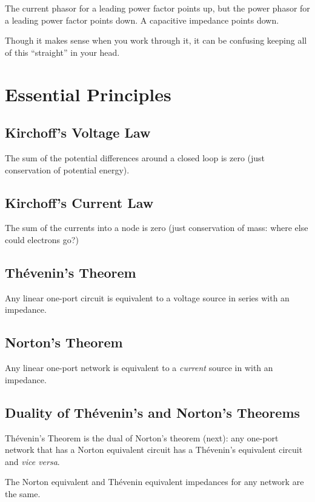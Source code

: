 \documentclass[11pt]{article}
\begin{document}
The current phasor for a leading power factor points up, but the power
phasor for a leading power factor points down. A capacitive impedance
points down.

Though it makes sense when you work through it, it can be confusing
keeping all of this ``straight'' in your head.


\section{Essential Principles}

\subsection{Kirchoff's Voltage Law}

The sum of the potential differences around a closed loop is zero (just conservation of potential energy).

\subsection{Kirchoff's Current Law}

The sum of the currents into a node is zero (just conservation of mass: where else could electrons go?)

\subsection{Th\'evenin's Theorem}

Any linear one-port circuit is equivalent to a voltage source in
series with an impedance.

\subsection{Norton's Theorem}

Any linear one-port network is equivalent to a \emph{current} source
in  with an impedance.

\subsection{Duality of Th\'evenin's and Norton's Theorems}

Th\'evenin's Theorem is the dual of Norton's theorem (next): any
one-port network that has a Norton equivalent circuit has a
Th\'evenin's equivalent circuit and {\it vice versa}.

The Norton equivalent and Th\'evenin equivalent impedances for any
network are the same.
\end{document}
